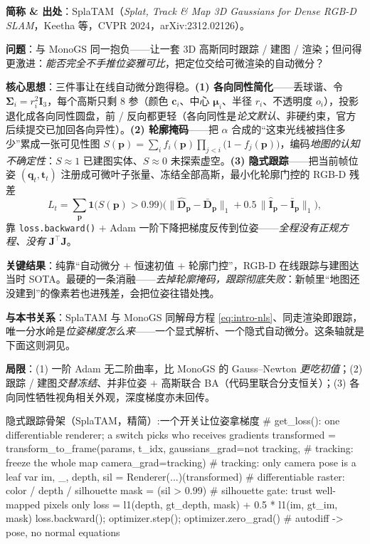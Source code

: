 \begin{paper}
\textbf{简称 \& 出处}：SplaTAM（\emph{Splat, Track \& Map 3D Gaussians for Dense RGB-D SLAM}，Keetha 等，CVPR 2024，arXiv:2312.02126）\cite{keetha2024splatam}。

\textbf{问题}：与 MonoGS 同一抱负——让一套 3D 高斯同时跟踪 / 建图 / 渲染；但问得更激进：\emph{能否完全不手推位姿雅可比}，把定位交给可微渲染的自动微分？

\textbf{核心思想}：三件事让在线自动微分跑得稳。\textbf{(1) 各向同性简化}——丢球谐、令 $\boldsymbol\Sigma_i=r_i^2\mathbf I_3$，每个高斯只剩 $8$ 参（颜色 $\mathbf c_i$、中心 $\boldsymbol\mu_i$、半径 $r_i$、不透明度 $o_i$），投影退化成各向同性圆盘，前 / 反向都更轻（各向同性是\emph{论文默认}、非硬约束，官方后续提交已加回各向异性）。\textbf{(2) 轮廓掩码}——把 $\alpha$ 合成的“这束光线被挡住多少”累成一张可见性图 $S(\mathbf p)=\sum_i f_i(\mathbf p)\prod_{j<i}\big(1-f_j(\mathbf p)\big)$，编码\emph{地图的认知不确定性}：$S\!\approx\!1$ 已建图实体、$S\!\approx\!0$ 未探索虚空。\textbf{(3) 隐式跟踪}——把当前帧位姿 $(\mathbf q_t,\mathbf t_t)$ 注册成可微叶子张量、冻结全部高斯，最小化轮廓门控的 RGB-D 残差
\[
L_t=\sum_{\mathbf p}\mathbf 1\!\big(S(\mathbf p)>0.99\big)\Big(\lVert\hat{\mathbf D}_{\mathbf p}-\bar{\mathbf D}_{\mathbf p}\rVert_1+0.5\,\lVert\hat{\mathbf I}_{\mathbf p}-\bar{\mathbf I}_{\mathbf p}\rVert_1\Big),
\]
靠 \texttt{loss.\allowbreak backward()} $+$ Adam 一阶下降把梯度反传到位姿——\emph{全程没有正规方程、没有} $\mathbf J^\top\mathbf J$。

\textbf{关键结果}：纯靠“自动微分 $+$ 恒速初值 $+$ 轮廓门控”，RGB-D 在线跟踪与建图达当时 SOTA。最硬的一条消融——\emph{去掉轮廓掩码，跟踪彻底失败}：新帧里“地图还没建到”的像素若也进残差，会把位姿往错处拽。

\textbf{与本书关系}：SplaTAM 与 MonoGS 同解母方程 \cref{eq:intro-nls}、同走渲染即跟踪，唯一分水岭是\emph{位姿梯度怎么来}——一个显式解析、一个隐式自动微分。这条轴就是下面这则洞见。

\textbf{局限}：(1) 一阶 Adam 无二阶曲率，比 MonoGS 的 Gauss--Newton \emph{更吃初值}；(2) 跟踪 / 建图\emph{交替冻结}、并非位姿 $+$ 高斯联合 BA（代码里联合分支恒关）；(3) 各向同性牺牲视角相关外观，深度梯度亦未回传。
\end{paper}

\begin{codebox}[Python]{隐式跟踪骨架（SplaTAM，精简）:一个开关让位姿拿梯度}
# get_loss(): one differentiable renderer; a switch picks who receives gradients
transformed = transform_to_frame(params, t_idx,
                gaussians_grad=not tracking,   # tracking: freeze the whole map
                camera_grad=tracking)          # tracking: only camera pose is a leaf var
im, _, depth, sil = Renderer(...)(transformed) # differentiable raster: color / depth / silhouette
mask = (sil > 0.99)                             # silhouette gate: trust well-mapped pixels only
loss = l1(depth, gt_depth, mask) + 0.5 * l1(im, gt_im, mask)
loss.backward(); optimizer.step(); optimizer.zero_grad()   # autodiff -> pose, no normal equations
\end{codebox}


